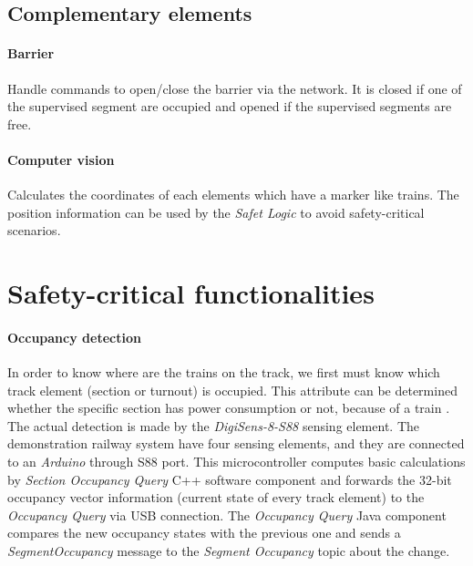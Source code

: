 \subsection{Complementary elements}
\paragraph{Barrier} Handle commands to open/close the barrier via the network. It is closed if one of the supervised segment are occupied and opened if the supervised segments are free.
\paragraph{Computer vision} Calculates the coordinates of each elements which have a marker like trains. The position information can be used by the \textit{Safet Logic} to avoid safety-critical scenarios.

\section{Safety-critical functionalities}\label{section:SC-Functionalities}

\paragraph{Occupancy detection}\label{par:FunctionOccupancyDetection}
In order to know where are the trains on the track, we first must know which track element (section or turnout) is occupied. This attribute can be determined whether the specific section has power consumption or not, because of a train . The actual detection is made by the \textit{DigiSens-8-S88} sensing element. The demonstration railway system have four sensing elements, and they are connected to an \textit{Arduino} through S88 port. This microcontroller computes basic calculations by \textit{Section Occupancy Query} C++ software component and forwards the 32-bit occupancy vector information (current state of every track element) to the \textit{Occupancy Query} via USB connection. The \textit{Occupancy Query} Java component compares the new occupancy states with the previous one and sends a \textit{SegmentOccupancy} message to the \textit{Segment Occupancy} topic about the change.

